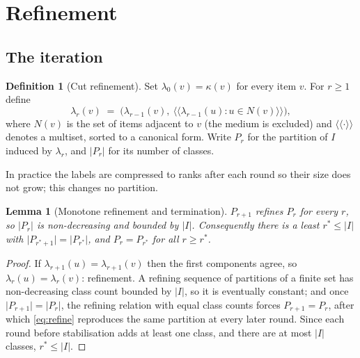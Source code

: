 \documentclass[11pt,twocolumn,a4paper]{article}
\theoremstyle{crthm}
\newtheorem{lemma}[theorem]{Lemma}
\theoremstyle{definition}
\newtheorem{definition}[theorem]{Definition}
\theoremstyle{remark}
\newcommand{\key}{\kappa}
\newcommand{\abs}[1]{\lvert#1\rvert}
\begin{document}
\section{Refinement}
\label{sec:refinement}

\subsection{The iteration}

\begin{definition}[Cut refinement]
\label{def:refine}
Set $\lambda_0(v)=\key(v)$ for every item $v$. For $r\ge1$ define
\begin{equation}
\lambda_r(v)\;=\;\bigl(\lambda_{r-1}(v),\
\langle\!\langle \lambda_{r-1}(u) : u\in N(v)\rangle\!\rangle\bigr),
\label{eq:refine}
\end{equation}
where $N(v)$ is the set of items adjacent to $v$ (the medium is excluded)
and $\langle\!\langle\cdot\rangle\!\rangle$ denotes a multiset, sorted to a
canonical form. Write $P_r$ for the partition of $I$ induced by
$\lambda_r$, and $\abs{P_r}$ for its number of classes.
\end{definition}

In practice the labels are compressed to ranks after each round so their
size does not grow; this changes no partition.

\begin{lemma}[Monotone refinement and termination]
\label{lem:monotone}
$P_{r+1}$ refines $P_r$ for every $r$, so $\abs{P_r}$ is non-decreasing
and bounded by $\abs{I}$. Consequently there is a least $r^{*}\le\abs{I}$
with $\abs{P_{r^{*}+1}}=\abs{P_{r^{*}}}$, and $P_r=P_{r^{*}}$ for all
$r\ge r^{*}$.
\end{lemma}

\begin{proof}
If $\lambda_{r+1}(u)=\lambda_{r+1}(v)$ then the first components agree, so
$\lambda_r(u)=\lambda_r(v)$: refinement. A refining sequence of partitions
of a finite set has non-decreasing class count bounded by $\abs{I}$, so it
is eventually constant; and once $\abs{P_{r+1}}=\abs{P_r}$, the refining
relation with equal class counts forces $P_{r+1}=P_r$, after which
\eqref{eq:refine} reproduces the same partition at every later round.
Since each round before stabilisation adds at least one class, and there
are at most $\abs{I}$ classes, $r^{*}\le\abs{I}$.
\end{proof}
\end{document}
